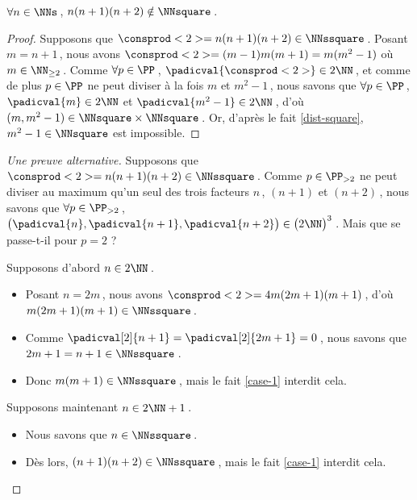 \begin{fact} \label{case-2}
	 $\forall n \in \NNs$\,, $n(n+1)(n+2) \notin \NNsquare$\,.
\end{fact}




\begin{proof}
    Supposons que $\consprod<2> = n(n+1)(n+2) \in \NNssquare$\,.
    Posant $m = n+1$\,, nous avons $\consprod<2> = (m-1)m(m+1) = m(m^2 - 1)$ où $m \in \NN_{\geq 2}$\,.
    Comme $\forall p \in \PP$\,, $\padicval{\consprod<2>} \in 2 \NN$\,, et comme de plus $p \in \PP$ ne peut diviser à la fois $m$ et $m^2 - 1$\,, nous savons que 
    $\forall p \in \PP$\,, 
    $\padicval{m} \in 2 \NN$ et $\padicval{m^2 - 1} \in 2 \NN$\,,
    d'où 
    $(m, m^2 - 1) \in \NNsquare \times \NNsquare$\,.
    Or, d'après le fait \ref{dist-square}, $m^2 - 1 \in \NNsquare$ est impossible.
\end{proof}




\begin{proof}[Une preuve alternative]
    Supposons que $\consprod<2> = n(n+1)(n+2) \in \NNssquare$\,.
    Comme $p \in \PP_{>2}$ ne peut diviser au maximum qu'un seul des trois facteurs $n$\,, $(n+1)$ et $(n+2)$\,, nous savons que 
    $\forall p \in \PP_{>2}$\,, 
    $\big( \padicval{n} , \padicval{n + 1} , \padicval{n + 2} \big) \in \big( 2 \NN \big)^3$\,.
    Mais que se passe-t-il pour $p = 2$ ?
    
    \medskip
    
    Supposons d'abord $n \in 2 \NN$\,.
	\begin{itemize}
		\item Posant $n = 2 m$\,, nous avons $\consprod<2> = 4 m(2m+1)(m+1)$\,, d'où $m(2m+1)(m+1) \in \NNssquare$\,.
		
		\item Comme $\padicval[2]{n+1} = \padicval[2]{2m+1} = 0$\,, nous savons que $2m+1 = n + 1 \in \NNssquare$\,.
		
		\item Donc $m(m+1)\in \NNssquare$\,, mais le fait \ref{case-1} interdit cela.
	\end{itemize}
    
    \medskip
    
    Supposons maintenant $n \in 2 \NN + 1$\,.
	\begin{itemize}
		\item Nous savons que $n \in \NNssquare$\,.

		\item Dès lors, $(n+1)(n+2) \in \NNssquare$\,, mais le fait \ref{case-1} interdit cela.
	\end{itemize}
\end{proof}